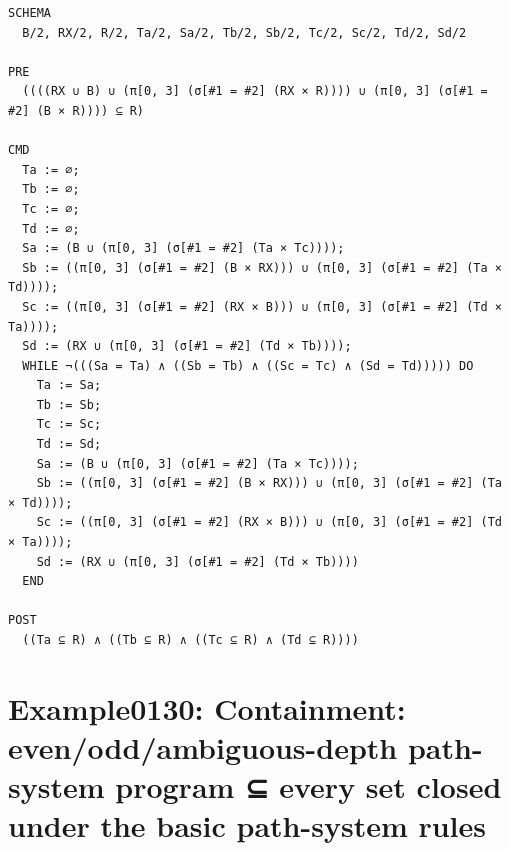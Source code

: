 \documentclass[10pt]{article}
\begin{document}
\begin{Verbatim}[fontsize=\scriptsize,breaklines=true,breakanywhere=true,frame=single,framesep=1.5mm]
SCHEMA
  B/2, RX/2, R/2, Ta/2, Sa/2, Tb/2, Sb/2, Tc/2, Sc/2, Td/2, Sd/2

PRE
  ((((RX ∪ B) ∪ (π[0, 3] (σ[#1 = #2] (RX × R)))) ∪ (π[0, 3] (σ[#1 = #2] (B × R)))) ⊆ R)

CMD
  Ta := ∅;
  Tb := ∅;
  Tc := ∅;
  Td := ∅;
  Sa := (B ∪ (π[0, 3] (σ[#1 = #2] (Ta × Tc))));
  Sb := ((π[0, 3] (σ[#1 = #2] (B × RX))) ∪ (π[0, 3] (σ[#1 = #2] (Ta × Td))));
  Sc := ((π[0, 3] (σ[#1 = #2] (RX × B))) ∪ (π[0, 3] (σ[#1 = #2] (Td × Ta))));
  Sd := (RX ∪ (π[0, 3] (σ[#1 = #2] (Td × Tb))));
  WHILE ¬(((Sa = Ta) ∧ ((Sb = Tb) ∧ ((Sc = Tc) ∧ (Sd = Td))))) DO
    Ta := Sa;
    Tb := Sb;
    Tc := Sc;
    Td := Sd;
    Sa := (B ∪ (π[0, 3] (σ[#1 = #2] (Ta × Tc))));
    Sb := ((π[0, 3] (σ[#1 = #2] (B × RX))) ∪ (π[0, 3] (σ[#1 = #2] (Ta × Td))));
    Sc := ((π[0, 3] (σ[#1 = #2] (RX × B))) ∪ (π[0, 3] (σ[#1 = #2] (Td × Ta))));
    Sd := (RX ∪ (π[0, 3] (σ[#1 = #2] (Td × Tb))))
  END

POST
  ((Ta ⊆ R) ∧ ((Tb ⊆ R) ∧ ((Tc ⊆ R) ∧ (Td ⊆ R))))
\end{Verbatim}

\Needspace{0.45\textheight}

\section{Example0130: Containment: even/odd/ambiguous-depth path-system program ⊆ every set closed under the basic path-system rules}\label{case:Example0130}
\end{document}
